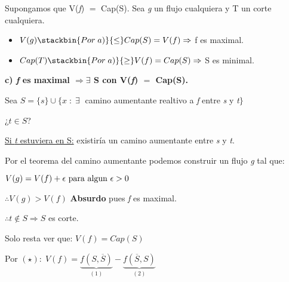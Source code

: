 \documentclass[12pt,a4paper]{report}
\begin{document}
			\vspace{2mm}
			Supongamos que V(\textit{f}) $=$ Cap(S). Sea \textit{g} un flujo cualquiera y T un corte cualquiera.
			\begin{itemize}
				\item $V(g) \stackbin{Por \; a)}{\leq} Cap(S) = V(f) \Rightarrow$ f es maximal.
				\item $Cap(T) \stackbin{Por \; a)}{\geq} V(f) = Cap(S) \Rightarrow$ S es minimal.
			\end{itemize}

		\vspace{5mm}
		\textbf{c) \textit{f} es maximal $\Rightarrow \exists$ S con V(\textit{f}) $=$ Cap(S).}

			\vspace{2mm}
			Sea $S = \{s\} \cup \{x \; : \; \exists \;$ camino aumentante realtivo a \textit{f} entre \textit{s} y \textit{t}$\}$

			\vspace{5mm}
			¿$t \in S$?

			\underline{Si \textit{t} estuviera en S:} existiría un camino aumentante entre \textit{s} y \textit{t}.

				Por el teorema del camino aumentante podemos construir un  flujo \textit{g} tal que:
				\begin{center}
					$V(g) = V(f) + \epsilon \textup{ para algun } \epsilon > 0$

					$\therefore V(g) > V(f)$ \textbf{Absurdo} pues \textit{f} es maximal.
				\end{center}

				$\therefore t \notin S \Rightarrow S$ es corte.

				\begin{center}
					Solo resta ver que: $V(f) = Cap(S)$
				\end{center}

				Por $(\star): \; V(f) =  \underbrace{f(S, \overline{S})}_{(1)} - \underbrace{f(\overline{S}, S)}_{(2)}$
\end{document}
